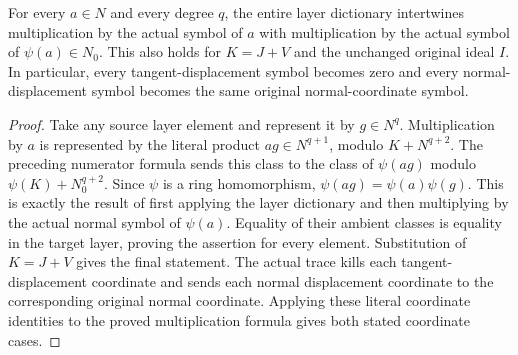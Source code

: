 \begin{theorem}
\label{hir:actual-tangent-cut-layer-symbols}
\leanok
For every $a\in N$ and every degree $q$, the entire layer dictionary
intertwines multiplication by the actual symbol of $a$ with
multiplication by the actual symbol of $\psi(a)\in N_0$. This also
holds for $K=J+V$ and the unchanged original ideal $I$. In particular,
every tangent-displacement symbol becomes zero and every normal-displacement
symbol becomes the same original normal-coordinate symbol.
\end{theorem}
\begin{proof}
Take any source layer element and represent it by $g\in N^q$.
Multiplication by $a$ is represented by the literal product
$ag\in N^{q+1}$, modulo $K+N^{q+2}$. The preceding numerator formula
sends this class to the class of $\psi(ag)$ modulo
$\psi(K)+N_0^{q+2}$. Since $\psi$ is a ring homomorphism,
$\psi(ag)=\psi(a)\psi(g)$. This is exactly the result of first
applying the layer dictionary and then multiplying by the actual
normal symbol of $\psi(a)$. Equality of their ambient classes is
equality in the target layer, proving the assertion for every
element. Substitution of $K=J+V$ gives the final statement. The actual
trace kills each tangent-displacement coordinate and sends each normal
displacement coordinate to the corresponding original normal coordinate.
Applying these literal coordinate identities to the proved multiplication
formula gives both stated coordinate cases.
\end{proof}

